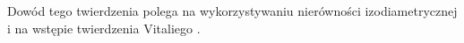 Dowód tego twierdzenia polega na wykorzystywaniu nierówności izodiametrycznej \citep[2.10.3]{Federer} 
i na wstępie twierdzenia Vitaliego \citep[2.8.18]{Federer}.